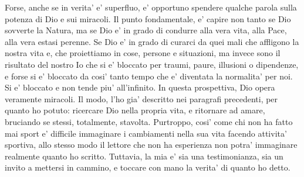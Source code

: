 Forse, anche se in verita' e' superfluo, e' opportuno spendere qualche parola sulla potenza di Dio e sui miracoli. Il punto fondamentale, e' capire non tanto se Dio sovverte la Natura, ma se Dio e' in grado di condurre alla vera vita, alla Pace, alla vera estasi perenne. Se Dio e' in grado di curarci da quei mali che affligono la nostra vita e, che proiettiamo in cose, persone e situazioni, ma invece sono il risultato del nostro Io che si e' bloccato per traumi, paure, illusioni o dipendenze, e forse si e' bloccato da cosi' tanto tempo che e' diventata la normalita' per noi. Si e' bloccato e non tende piu' all'infinito. In questa prospettiva, Dio opera veramente miracoli. Il modo, l'ho gia' descritto nei paragrafi precedenti, per quanto ho potuto: ricercare Dio nella propria vita, e ritornare ad amare, bruciando se stessi, totalmente, stavolta. Purtroppo, cosi' come chi non ha fatto mai sport e' difficile immaginare i cambiamenti nella sua vita facendo attivita' sportiva, allo stesso modo il lettore che non ha esperienza non potra' immaginare realmente quanto ho scritto. Tuttavia, la mia e' sia una testimonianza, sia un invito a mettersi in cammino, e toccare con mano la verita' di quanto ho detto.



